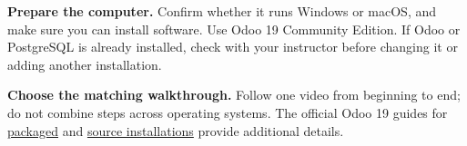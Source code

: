 \begin{utpsteps}
  \item \textbf{Prepare the computer.} Confirm whether it runs Windows or
    macOS, and make sure you can install software. Use Odoo 19 Community
    Edition. If Odoo or PostgreSQL is already installed, check with your
    instructor before changing it or adding another installation.
  \item \textbf{Choose the matching walkthrough.} Follow one video from
    beginning to end; do not combine steps across operating systems. The
    official Odoo 19 guides for \href{https://www.odoo.com/documentation/19.0/administration/on_premise/packages.html}{packaged}
    and \href{https://www.odoo.com/documentation/19.0/administration/on_premise/source.html}{source installations} provide additional details.


\end{utpsteps}
